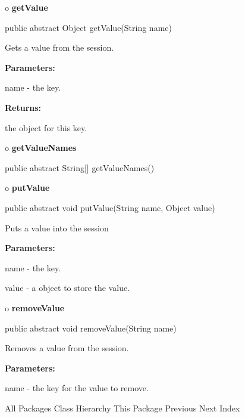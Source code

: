 o {\bf getValue} 

\begin{PRE}
 public abstract Object getValue(String name)
\end{PRE}

\begin{description}
\htmlDD Gets a value from the session. 

\begin{description}
\item {\bf Parameters:}  

name - the key.  
\item {\bf Returns:}  

the object for this key.  
\end{description}

\end{description}

o {\bf getValueNames} 

\begin{PRE}
 public abstract String[] getValueNames()
\end{PRE}

o {\bf putValue} 

\begin{PRE}
 public abstract void putValue(String name,
                               Object value)
\end{PRE}

\begin{description}
\htmlDD Puts a value into the session 

\begin{description}
\item {\bf Parameters:}  

name - the key.  

value - a object to store the value.  
\end{description}

\end{description}

o {\bf removeValue} 

\begin{PRE}
 public abstract void removeValue(String name)
\end{PRE}

\begin{description}
\htmlDD Removes a value from the session. 

\begin{description}
\item {\bf Parameters:}  

name - the key for the value to remove.  
\end{description}

\end{description}

\htmlHR

\begin{PRE}
All Packages  Class Hierarchy  This Package  Previous  Next  Index
\end{PRE}

